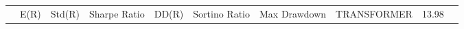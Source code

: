 \begin{tabular}{lrrrrrrrrr}
 & E(R) & Std(R) & Sharpe Ratio & DD(R) & Sortino Ratio & Max Drawdown & %
TRANSFORMER & 13.98%
\end{tabular}
